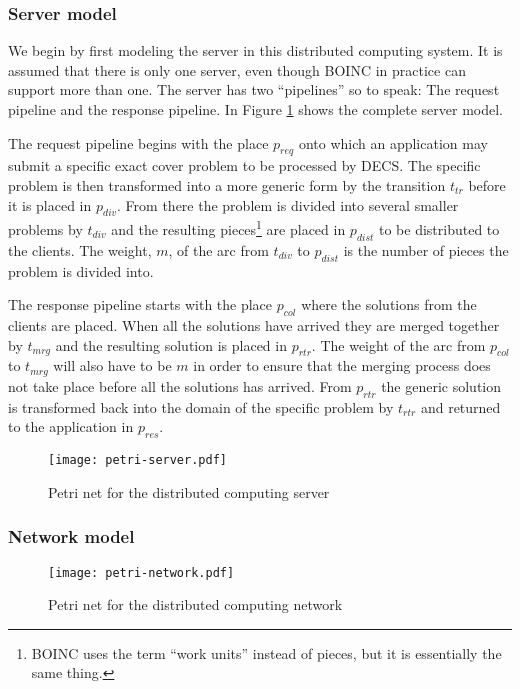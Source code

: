 \subsubsection{Server model}

We begin by first modeling the server in this distributed computing system.
It is assumed that there is only one server, even though BOINC in practice can support more than one.
The server has two ``pipelines'' so to speak: The request pipeline and the response pipeline.
In Figure \ref{fig:petri-server} shows the complete server model.

The request pipeline begins with the place $p_{req}$ onto which an application may submit a specific exact cover problem to be processed by DECS.
The specific problem is then transformed into a more generic form by the transition $t_{tr}$ before it is placed in $p_{div}$.
From there the problem is divided into several smaller problems by $t_{div}$ and the resulting pieces\footnote{BOINC uses the term ``work units'' instead of pieces, but it is essentially the same thing.} are placed in $p_{dist}$ to be distributed to the clients.
The weight, $m$, of the arc from $t_{div}$ to $p_{dist}$ is the number of pieces the problem is divided into.

The response pipeline starts with the place $p_{col}$ where the solutions from the clients are placed.
When all the solutions have arrived they are merged together by $t_{mrg}$ and the resulting solution is placed in $p_{rtr}$.
The weight of the arc from $p_{col}$ to $t_{mrg}$ will also have to be $m$ in order to ensure that the merging process does not take place before all the solutions has arrived.
From $p_{rtr}$ the generic solution is transformed back into the domain of the specific problem by $t_{rtr}$ and returned to the application in $p_{res}$.

\begin{figure}[htbp]
	\centering 
	\texttt{[image: petri-server.pdf]}
	\caption{Petri net for the distributed computing server}
	\label{fig:petri-server}
\end{figure}


\subsubsection{Network model}

\begin{figure}[htbp]
	\centering 
	\texttt{[image: petri-network.pdf]}
	\caption{Petri net for the distributed computing network}
	\label{fig:petri-network}
\end{figure}

